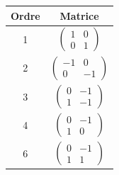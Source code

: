\documentclass[8pt]{book}
\begin{document}
	\begin{center}
		
	\begin{tabular}{c|c}
		Ordre & Matrice\\
		\hline
		1& $\begin{pmatrix}
			1& 0\\
			0& 1
		\end{pmatrix}$\\
		2&$\begin{pmatrix}
			-1& 0\\
			0& -1
		\end{pmatrix}$\\
		3&$\begin{pmatrix}
			0&-1 \\
			1& -1
		\end{pmatrix}$\\
		4&$\begin{pmatrix}
			0& -1\\
			1& 0
		\end{pmatrix}$\\
		6&$\begin{pmatrix}
			0&-1 \\
			1& 1
		\end{pmatrix}$\\
	\end{tabular}
	\end{center}
	
\end{document}

